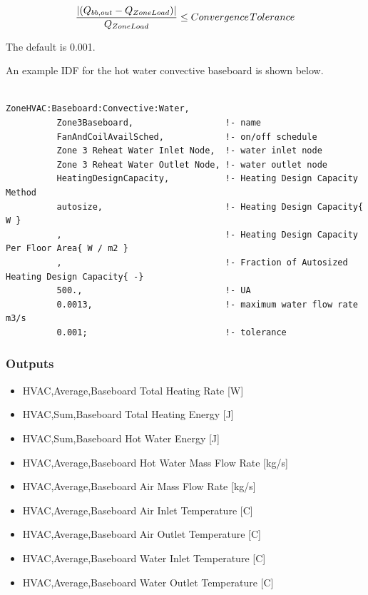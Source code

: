 \begin{equation}
\frac{{\left| {({Q_{bb,out}} - {Q_{ZoneLoad}})} \right|}}{{{Q_{ZoneLoad}}}} \le Convergence{\kern 1pt} Tolerance
\end{equation}

The default is 0.001.

An example IDF for the hot water convective baseboard is shown below.

\begin{lstlisting}

ZoneHVAC:Baseboard:Convective:Water,
          Zone3Baseboard,                  !- name
          FanAndCoilAvailSched,            !- on/off schedule
          Zone 3 Reheat Water Inlet Node,  !- water inlet node
          Zone 3 Reheat Water Outlet Node, !- water outlet node
          HeatingDesignCapacity,           !- Heating Design Capacity Method
          autosize,                        !- Heating Design Capacity{ W }
          ,                                !- Heating Design Capacity Per Floor Area{ W / m2 }
          ,                                !- Fraction of Autosized Heating Design Capacity{ -}
          500.,                            !- UA
          0.0013,                          !- maximum water flow rate m3/s
          0.001;                           !- tolerance
\end{lstlisting}

\subsubsection{Outputs}\label{outputs-3-015}

\begin{itemize}
\item
  HVAC,Average,Baseboard Total Heating Rate {[}W{]}
\item
  HVAC,Sum,Baseboard Total Heating Energy {[}J{]}
\item
  HVAC,Sum,Baseboard Hot Water Energy {[}J{]}
\item
  HVAC,Average,Baseboard Hot Water Mass Flow Rate {[}kg/s{]}
\item
  HVAC,Average,Baseboard Air Mass Flow Rate {[}kg/s{]}
\item
  HVAC,Average,Baseboard Air Inlet Temperature {[}C{]}
\item
  HVAC,Average,Baseboard Air Outlet Temperature {[}C{]}
\item
  HVAC,Average,Baseboard Water Inlet Temperature {[}C{]}
\item
  HVAC,Average,Baseboard Water Outlet Temperature {[}C{]}
\end{itemize}

